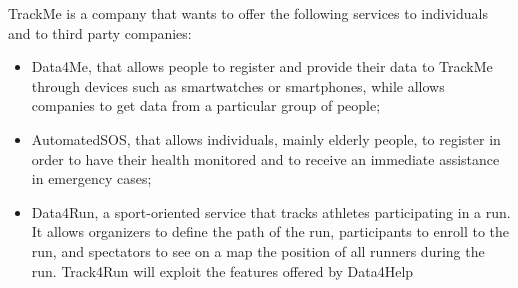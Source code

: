 TrackMe is a company that wants to offer the following services to individuals and to third party companies:
\begin{itemize}

\item Data4Me, that allows people to register and provide their data to TrackMe through devices such as smartwatches or smartphones, while allows companies to get data from a particular group of people;

\item AutomatedSOS, that allows individuals, mainly elderly people, to register in order to have their health monitored and to receive an immediate assistance in emergency cases;

\item Data4Run, a sport-oriented service that tracks athletes participating in a run. It allows organizers to define the path of the run, participants to enroll to the run, and spectators to see on a map the position of all runners during the run. Track4Run will exploit the features offered by Data4Help

\end{itemize}